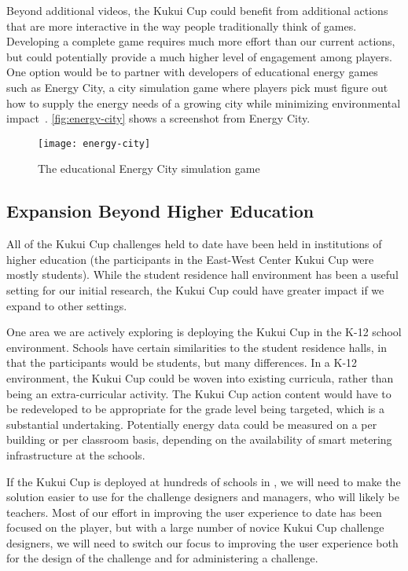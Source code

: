 Beyond additional videos, the Kukui Cup could benefit from additional actions that are more interactive in the way people traditionally think of games. Developing a complete game requires much more effort than our current actions, but could potentially provide a much higher level of engagement among players. One option would be to partner with developers of educational energy games such as Energy City, a city simulation game where players pick must figure out how to supply the energy needs of a growing city while minimizing environmental impact~\cite{energy-city}. \autoref{fig:energy-city} shows a screenshot from Energy City.

\begin{figure}[htbp]
	\centering
	\texttt{[image: energy-city]}
	\caption{The educational Energy City simulation game}
	\label{fig:energy-city}
\end{figure}


\subsection{Expansion Beyond Higher Education}

All of the Kukui Cup challenges held to date have been held in institutions of higher education (the participants in the East-West Center Kukui Cup were mostly students). While the student residence hall environment has been a useful setting for our initial research, the Kukui Cup could have greater impact if we expand to other settings.

One area we are actively exploring is deploying the Kukui Cup in the K-12 school environment. Schools have certain similarities to the student residence halls, in that the participants would be students, but many differences. In a K-12 environment, the Kukui Cup could be woven into existing curricula, rather than being an extra-curricular activity. The Kukui Cup action content would have to be redeveloped to be appropriate for the grade level being targeted, which is a substantial undertaking. Potentially energy data could be measured on a per building or per classroom basis, depending on the availability of smart metering infrastructure at the schools.

If the Kukui Cup is deployed at hundreds of schools in \Hawaii, we will need to make the solution easier to use for the challenge designers and managers, who will likely be teachers. Most of our effort in improving the user experience to date has been focused on the player, but with a large number of novice Kukui Cup challenge designers, we will need to switch our focus to improving the user experience both for the design of the challenge and for administering a challenge.

